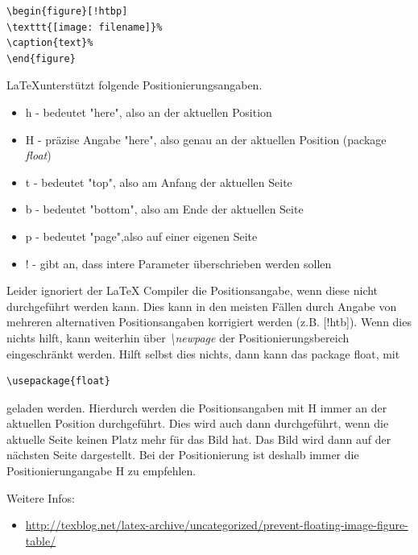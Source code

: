 \documentclass[TGAI_Laborbericht.tex]{subfiles}
\begin{document}
\begin{lstlisting}[style=LATEX, frame=single, caption=Positionierung von Bildern , captionpos=b, label=lst:POS_PIC]
\begin{figure}[!htbp]
\texttt{[image: filename]}%
\caption{text}%
\end{figure}
\end{lstlisting}

\LaTeX unterstützt folgende Positionierungsangaben.
\begin{itemize}
	\item h -  bedeutet "here", also an der aktuellen Position
	\item H -  präzise Angabe "here", also genau an der aktuellen Position (package \textit{float})
	\item t -  bedeutet "top", also am Anfang der aktuellen Seite
	\item b -  bedeutet "bottom", also am Ende der aktuellen Seite
	\item p -  bedeutet "page",also auf einer eigenen Seite
	\item ! -  gibt an, dass intere Parameter überschrieben werden sollen
\end{itemize}

Leider ignoriert der LaTeX Compiler die Positionsangabe, wenn diese nicht durchgeführt werden kann. Dies kann in den meisten Fällen durch Angabe von mehreren alternativen Positionsangaben korrigiert werden (z.B. [!htb]). Wenn dies nichts hilft, kann weiterhin über \textit{\textbackslash newpage}  der Positionierungsbereich eingeschränkt werden. Hilft selbst dies nichts, dann kann das package float, mit
\begin{lstlisting}[style=LATEX]
\usepackage{float}
\end{lstlisting}
geladen werden. Hierdurch werden die Positionsangaben mit H immer an der aktuellen Position durchgeführt. Dies wird auch dann durchgeführt, wenn die aktuelle Seite keinen Platz mehr für das Bild hat. Das Bild wird dann auf der nächsten Seite dargestellt. Bei der Positionierung ist deshalb immer die Positionierungangabe H zu empfehlen.

Weitere Infos:
\begin{itemize}
  \item \href{http://texblog.net/latex-archive/uncategorized/prevent-floating-image-figure-table/}{http://texblog.net/latex-archive/uncategorized/prevent-floating-image-figure-table/}
\end{itemize}
\end{document}
